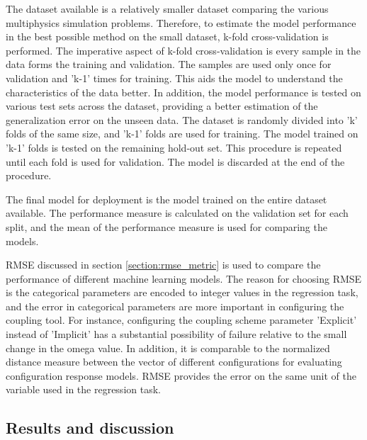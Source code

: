 The dataset available is a relatively smaller dataset comparing the various multiphysics simulation problems. Therefore, to estimate the model performance in the best possible method on the small dataset, k-fold cross-validation is performed. The imperative aspect of k-fold cross-validation is every sample in the data forms the training and validation. The samples are used only once for validation and 'k-1' times for training. This aids the model to understand the characteristics of the data better. In addition, the model performance is tested on various test sets across the dataset, providing a better estimation of the generalization error on the unseen data. The dataset is randomly divided into 'k' folds of the same size, and 'k-1' folds are used for training. The model trained on 'k-1' folds is tested on the remaining hold-out set. This procedure is repeated until each fold is used for validation. The model is discarded at the end of the procedure.

The final model for deployment is the model trained on the entire dataset available. The performance measure is calculated on the validation set for each split, and the mean of the performance measure is used for comparing the models.


RMSE discussed in section \ref{section:rmse_metric} is used to compare the performance of different machine learning models. The reason for choosing RMSE is the categorical parameters are encoded to integer values in the regression task, and the error in categorical parameters are more important in configuring the coupling tool. For instance, configuring the coupling scheme parameter 'Explicit' instead of 'Implicit' has a substantial possibility of failure relative to the small change in the omega value. In addition, it is comparable to the normalized distance measure between the vector of different configurations for evaluating configuration response models. RMSE provides the error on the same unit of the variable used in the regression task.

\subsection{Results and discussion}

